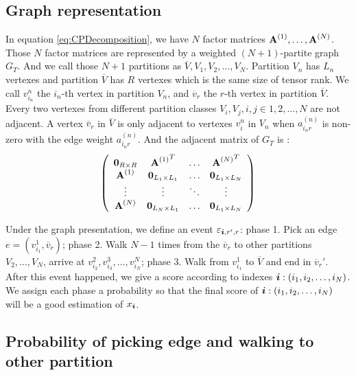 \documentclass{article}
\newcommand{\Sca}[3]{{#1}^{(#2)}_{i_#2#3}}%
\newcommand{\V}[1]{{\bm{{\MakeLowercase{#1}}}}}%
\newcommand{\M}[1]{{\bm{\mathbf{\MakeUppercase{#1}}}}}%
\newcommand{\Mn}[2]{\M{#1}^{(#2)}}%
\begin{document}
\subsection{Graph representation}
In equation \ref{eq:CPDecomposition}, we have $N$ factor matrices $\Mn{A}{1},\dots,\Mn{A}{N}$.
Those $N$ factor matrices are represented by a weighted $(N+1)$-partite graph $G_{T}$. And we call those $N+1$ partitions as $\overline{V},V_{1},V_{2},\ldots,V_{N}$. Partition $V_{n}$ has $L_n$ vertexes and partition $\overline{V}$ has $R$ vertexes which is the same size of tensor rank. We call $v^n_{i_n}$ the $i_n$-th vertex in partition $V_{n}$, and $\overline{v}_{r}$ the $r$-th vertex in partition $\overline{V}$. Every two vertexes from different partition classes $V_i,V_j,i,j\in {1,2,\ldots,N}$ are not adjacent. A vertex $\overline{v}_r$ in $\overline{V}$ is only adjacent to vertexes $v^n_i$ in $V_n$ when $\Sca{a}{n}{r}$ is non-zero with the edge weight $\Sca{a}{n}{r}$. And the adjacent matrix of $G_{T}$ is :
\[
\left(
  \begin{array}{cccc}
    \M{0}_{R\times R}   & {\Mn{A}{1}}^T         & \ldots & {\Mn{A}{N}}^T \\
    \Mn{A}{1}           & \M{0}_{L_1\times L_1} & \ldots & \M{0}_{L_1\times L_N} \\
    \vdots              & \vdots                & \ddots & \vdots \\
    \Mn{A}{N}           & \M{0}_{L_N\times L_1} & \ldots & \M{0}_{L_1\times L_N} \\
  \end{array}
\right)
\]

Under the graph presentation, we define an event $\varepsilon_{\V{i},r',r}$: phase 1. Pick an edge $e=(v^1_{i_1},\overline{v}_r)$; phase 2. Walk $N-1$ times from the $\overline{v}_r$ to other partitions $V_2,\ldots,V_N$, arrive at $v^2_{i_2},v^3_{i_3},\ldots,v^N_{i_N}$; phase 3. Walk from $v^1_{i_1}$ to $\overline{V}$ and end in $\overline{v}_r'$. After this event happened, we give a score according to indexes $\V{i}:(i_1,i_2,\ldots,i_N)$. We assign each phase a probability so that the final score of $\V{i}:(i_1,i_2,\ldots,i_N)$ will be a good estimation of $x_{\V{i}}$.

\subsection{Probability of picking edge and walking to other partition}
\end{document}
